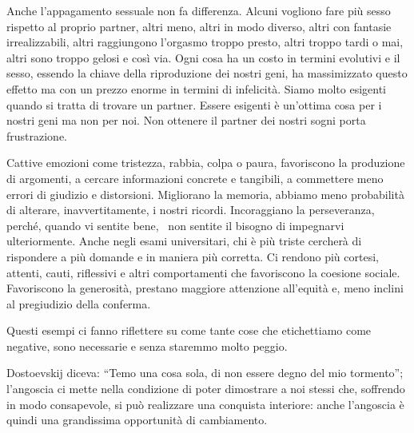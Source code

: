 \documentclass[12pt]{book} %
\begin{document}
\begin{mdframed}[linewidth=1pt]
Anche l'appagamento sessuale non fa differenza. Alcuni vogliono fare più sesso rispetto al proprio
partner, altri meno, altri in modo diverso, altri con fantasie irrealizzabili, altri raggiungono
l'orgasmo troppo presto, altri troppo tardi o mai, altri sono troppo gelosi e così via. Ogni cosa
ha un costo in termini evolutivi e il sesso, essendo la chiave della riproduzione dei nostri geni, ha massimizzato
questo effetto ma con un prezzo enorme in termini di infelicità. Siamo molto esigenti quando si tratta di trovare un
partner. Essere esigenti è un'ottima cosa per i nostri geni ma non per noi. Non ottenere il
partner dei nostri sogni porta frustrazione.

Cattive emozioni come tristezza, rabbia, colpa o paura, favoriscono la produzione di
argomenti, a cercare informazioni
concrete e tangibili, a commettere meno errori di giudizio e distorsioni. Migliorano la memoria, abbiamo meno
probabilità di alterare, inavvertitamente, i nostri ricordi. Incoraggiano la perseveranza, perché, quando vi sentite
bene, \ non sentite il bisogno di impegnarvi ulteriormente. Anche negli esami universitari, chi è più triste cercherà
di rispondere a più domande e in maniera più corretta. Ci rendono più cortesi, attenti, cauti, riflessivi e altri
comportamenti che favoriscono la coesione
sociale. Favoriscono la generosità, prestano
maggiore attenzione all'equità e, meno inclini al pregiudizio della conferma.

Questi esempi ci fanno riflettere su come tante cose che etichettiamo come negative, sono necessarie e senza staremmo
molto peggio.

Dostoevskij diceva: “Temo una cosa sola, di non essere degno del mio tormento”; l'angoscia ci mette
nella condizione di poter dimostrare a noi stessi che, soffrendo in modo consapevole, si può realizzare una conquista
interiore: anche l'angoscia è quindi una grandissima opportunità di cambiamento. 


\end{mdframed}
\end{document}
